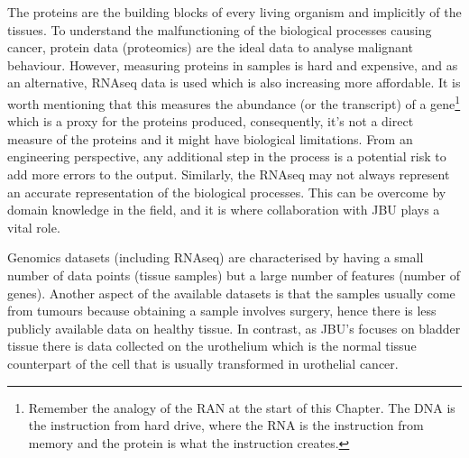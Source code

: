 \vspace{3mm}
\vspace{3mm}

The proteins are the building blocks of every living organism and implicitly of the tissues. To understand the malfunctioning of the biological processes causing cancer, protein data (proteomics) are the ideal data to analyse malignant behaviour. However, measuring proteins in samples is hard and expensive, and as an alternative, RNAseq data is used which is also increasing more affordable. It is worth mentioning that this measures the abundance (or the transcript) of a gene\footnote{Remember the analogy of the RAN at the start of this Chapter. The DNA is the instruction from hard drive, where the RNA is the instruction from memory and the protein is what the instruction creates.} which is a proxy for the proteins produced, consequently, it's not a direct measure of the proteins and it might have biological limitations. From an engineering perspective, any additional step in the process is a potential risk to add more errors to the output. Similarly, the RNAseq may not always represent an accurate representation of the biological processes. This can be overcome by domain knowledge in the field, and it is where collaboration with JBU plays a vital role.

Genomics datasets (including RNAseq) are characterised by having a small number of data points (tissue samples) but a large number of features (number of genes). Another aspect of the available datasets is that the samples usually come from tumours because obtaining a sample involves surgery, hence there is less publicly available data on healthy tissue. In contrast, as JBU's focuses on bladder tissue there is data collected on the urothelium which is the normal tissue counterpart of the cell that is usually transformed in urothelial cancer.

